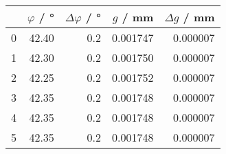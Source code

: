 \begin{tabular}{lrrrr}
\toprule
{} &  $\varphi$ / \si{\degree} &  $\Delta \varphi$ / \si{\degree} &  $g$ / mm &  $\Delta g$ / mm \\
\midrule
0 &                     42.40 &                              0.2 &  0.001747 &         0.000007 \\
1 &                     42.30 &                              0.2 &  0.001750 &         0.000007 \\
2 &                     42.25 &                              0.2 &  0.001752 &         0.000007 \\
3 &                     42.35 &                              0.2 &  0.001748 &         0.000007 \\
4 &                     42.35 &                              0.2 &  0.001748 &         0.000007 \\
5 &                     42.35 &                              0.2 &  0.001748 &         0.000007 \\
\bottomrule
\end{tabular}
